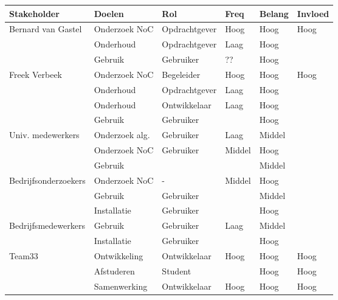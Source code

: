 {\tiny
\begin{center}
\begin{tabular}{llllll}\hline
{\bf Stakeholder}    & {\bf Doelen}   & {\bf Rol}     & {\bf Freq} & {\bf Belang} & {\bf Invloed}\\\hline
Bernard van Gastel   & Onderzoek NoC  & Opdrachtgever & Hoog       & Hoog   & Hoog \\
                     & Onderhoud      & Opdrachtgever & Laag       & Hoog   &  \\
                     & Gebruik        & Gebruiker     & ??         & Hoog   & \\
Freek Verbeek        & Onderzoek NoC  & Begeleider    & Hoog       & Hoog   & Hoog\\
                     & Onderhoud      & Opdrachtgever & Laag       & Hoog   & \\
                     & Onderhoud      & Ontwikkelaar  & Laag       & Hoog   & \\
                     & Gebruik        & Gebruiker     &            & Hoog   & \\
Univ. medewerkers    & Onderzoek alg. & Gebruiker     & Laag       & Middel & \\
                     & Onderzoek NoC  & Gebruiker     & Middel     & Hoog   & \\
                     & Gebruik        &               &            & Middel & \\
Bedrijfsonderzoekers & Onderzoek NoC  & -             & Middel     & Hoog   & \\
                     & Gebruik        & Gebruiker     &            & Middel & \\
                     & Installatie    & Gebruiker     &            & Hoog   & \\
Bedrijfsmedewerkers  & Gebruik        & Gebruiker     & Laag       & Middel & \\
                     & Installatie    & Gebruiker     &            & Hoog   & \\
Team33               & Ontwikkeling   & Ontwikkelaar  & Hoog       & Hoog   & Hoog\\
                     & Afstuderen     & Student       &            & Hoog   & Hoog\\
                     & Samenwerking   & Ontwikkelaar  & Hoog       & Hoog   & Hoog\\
\hline
\end{tabular}
\end{center}
}%

